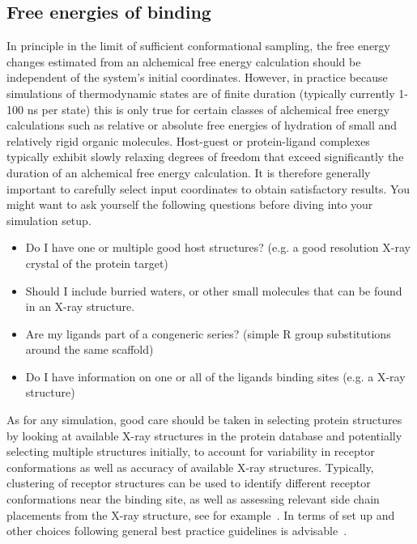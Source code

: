 \documentclass[9pt,bestpractices]{livecoms}
\begin{document}
\subsection*{Free energies of binding}
In principle in the limit of sufficient conformational sampling, the free energy changes estimated from an alchemical free energy calculation should be independent of the system's initial coordinates. However, in practice because simulations of thermodynamic states are of finite duration (typically currently 1-100 ns per state) this is only true for certain classes of alchemical free energy calculations such as relative or absolute free energies of hydration of small and relatively rigid organic molecules. Host-guest or protein-ligand complexes typically exhibit slowly relaxing degrees of freedom that exceed significantly the duration of an alchemical free energy calculation. It is therefore generally important to carefully select input coordinates to obtain satisfactory results. 
You might want to ask yourself the following questions before diving into your simulation setup. 
\begin{itemize}
    \item Do I have one or multiple good host structures? (e.g. a good resolution X-ray crystal of the protein target)
    \item Should I include burried waters, or other small molecules that can be found in an X-ray structure.
    \item Are my ligands part of a congeneric series? (simple R group substitutions around the same scaffold)
    \item Do I have information on one or all of the ligands binding sites (e.g. a X-ray structure)
\end{itemize}

As for any simulation, good care should be taken in selecting protein structures by looking at available X-ray structures in the protein database and potentially selecting multiple structures initially, to account for variability in receptor conformations as well as accuracy of available X-ray structures. Typically, clustering of receptor structures can be used to identify different receptor conformations near the binding site, as well as assessing relevant side chain placements from the X-ray structure, see for example~\cite{mey etal, the other D3R paper I can't remember}. In terms of set up and other choices following general best practice guidelines is advisable~\cite{braun2018best}.
\end{document}
